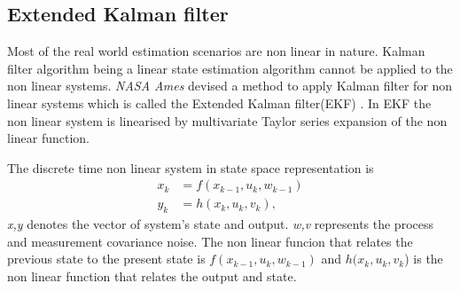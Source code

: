 \subsection{Extended Kalman filter}
Most of the real world estimation scenarios are non linear in nature. Kalman filter algorithm  being a linear state estimation algorithm cannot be applied to the non linear systems. \emph{NASA Ames} devised a method to apply Kalman filter for non linear systems which is called the Extended Kalman filter(EKF) \citep{ekf85}. In EKF the non linear system is linearised by multivariate Taylor series expansion of the non linear function. 

The discrete time non linear system in state space representation is
\begin{equation}
\label{eq:nl_disc}
\begin{split}
x_{k} &= f(x_{k-1},u_k,w_{k-1})\\
y_k &= h(x_k,u_k,v_k),
\end{split}
\end{equation}
\emph{x,y} denotes the vector of system's state and output. \emph{w,v} represents the process and measurement covariance noise. The non linear funcion that relates the previous state to the present state is  $f(x_{k-1},u_k,w_{k-1})$ and $h(x_k,u_k,v_k$) is the non linear function that relates the output and state. 

